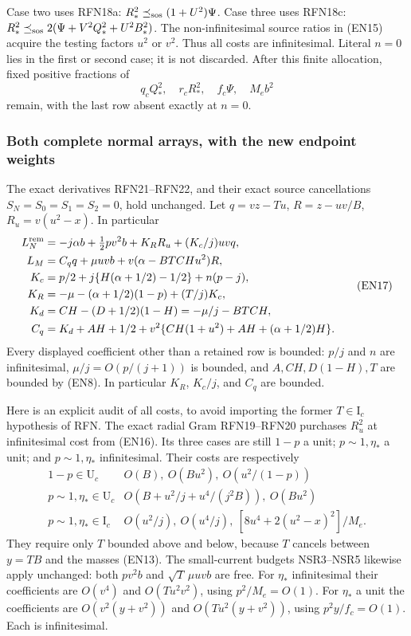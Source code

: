 Case two uses RFN18a:
$R_*^2\preceq_{\rm sos}(1+U^2)\Psi$.
Case three uses RFN18c:
$R_*^2\preceq_{\rm sos}2(\Psi+V^2Q_*^2+U^2B_*^2)$.
The non-infinitesimal source ratios in (EN15) acquire the testing
factors $u^2$ or $v^2$. Thus all costs are infinitesimal.
Literal $n=0$ lies in the first or second case; it is not discarded.
After this finite allocation, fixed positive fractions of
\[
q_cQ_*^2,\quad r_cR_*^2,\quad f_c\Psi,\quad M_eb^2       \tag{EN16}
\]
remain, with the last row absent exactly at $n=0$.

\subsubsection*{Both complete normal arrays, with the new endpoint weights}

The exact derivatives RFN21--RFN22, and their exact source cancellations
$S_N=S_0=S_1=S_2=0$, hold unchanged. Let
$q=vz-Tu$, $R=z-uv/B$, $R_u=v(u^2-x)$. In particular
\[
\begin{aligned}
L_N^{\rm rem}
&=-j\alpha b+\tfrac12pv^2b+K_RR_u+(K_c/j)uvq,\\
L_M&=C_qq+\mu uvb+v(\alpha-BTCHu^2)R,\\
K_c&=p/2+j\{H(\alpha+1/2)-1/2\}+n(p-j),\\
K_R&=-\mu-(\alpha+1/2)(1-p)+(T/j)K_c,\\
K_d&=CH-(D+1/2)(1-H)=-\mu/j-BTCH,\\
C_q&=K_d+AH+1/2+
v^2\{CH(1+u^2)+AH+(\alpha+1/2)H\}.
\end{aligned}                                                    \tag{EN17}
\]
Every displayed coefficient other than a retained row is bounded:
$p/j$ and $n$ are infinitesimal, $\mu/j=O(p/(j+1))$ is bounded,
and $A,CH,D(1-H),T$ are bounded by (EN8).
In particular $K_R$, $K_c/j$, and $C_q$ are bounded.

Here is an explicit audit of all costs, to avoid importing the former
$T\in\mathrm I_c$ hypothesis of RFN.
The exact radial Gram RFN19--RFN20 purchases $R_u^2$ at infinitesimal
cost from (EN16). Its three cases are still $1-p$ a unit;
$p\sim1,\eta_*$ a unit; and $p\sim1,\eta_*$ infinitesimal.
Their costs are respectively
\[
\begin{array}{c|l}
1-p\in\mathrm U_c&O(B),\ O(Bu^2),\ O(u^2/(1-p))\\
p\sim1,\eta_*\in\mathrm U_c&
 O(B+u^2/j+u^4/(j^2B)),\ O(Bu^2)\\
p\sim1,\eta_*\in\mathrm I_c&
 O(u^2/j),\ O(u^4/j),\
 [8u^4+2(u^2-x)^2]/M_e .
\end{array}                                                    \tag{EN18}
\]
They require only $T$ bounded above and below, because $T$ cancels
between $y=TB$ and the masses (EN13).
The small-current budgets NSR3--NSR5 likewise apply unchanged:
both $pv^2b$ and $\sqrt T\,\mu uvb$ are free.
For $\eta_*$ infinitesimal their coefficients are
$O(v^4)$ and $O(Tu^2v^2)$, using $p^2/M_e=O(1)$.
For $\eta_*$ a unit the coefficients are
$O(v^2(y+v^2))$ and $O(Tu^2(y+v^2))$, using
$p^2y/f_c=O(1)$. Each is infinitesimal.

